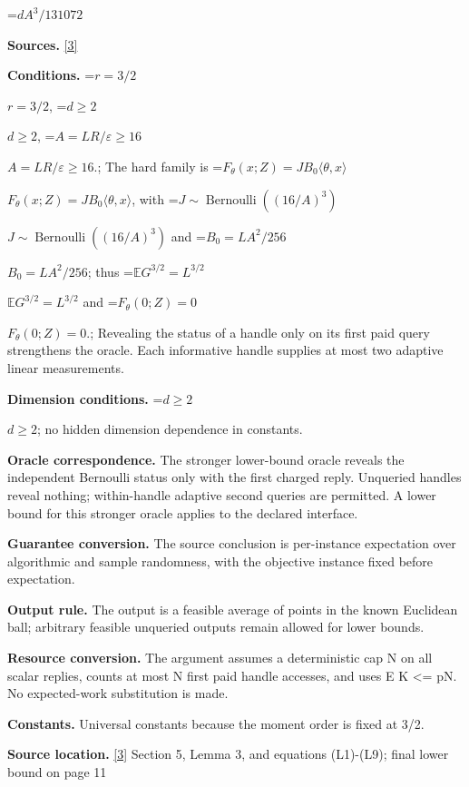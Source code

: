 \documentclass[10pt,a4paper]{article}
\newcommand{\AtlasMath}[1]{\par\begingroup\centering\setbox0=\hbox{$\displaystyle #1$}\ifdim\wd0>1.4\linewidth\typeout{ATLAS WIDE FORMULA: \the\wd0}\fi\ifdim\wd0>\linewidth\resizebox{\linewidth}{!}{\box0}\else\box0\fi\par\endgroup}
\newcommand{\AtlasInlineMath}[1]{\begingroup\setbox0=\hbox{$#1$}\ifdim\wd0>.4\linewidth\endgroup\AtlasMath{#1}\else\endgroup$#1$\fi}
\begin{document}
\AtlasMath{dA^3/131072}


\textbf{Sources.} \href{https://github.com/WU-Wendao/Colombo/blob/main/colombo_sensorium/Complexity_altas/data/sources/colombo/COLOMBO_KIMI_003/kimi_003.pdf}{[3]}



\textbf{Conditions.} \AtlasInlineMath{r=3/2}, \AtlasInlineMath{d\ge2}, \AtlasInlineMath{A=LR/\varepsilon\ge16}.; The hard family is \AtlasInlineMath{F_\theta(x;Z)=JB_0\langle\theta,x\rangle}, with \AtlasInlineMath{J\sim\operatorname{Bernoulli}((16/A)^3)} and \AtlasInlineMath{B_0=LA^2/256}; thus \AtlasInlineMath{\mathbb EG^{3/2}=L^{3/2}} and \AtlasInlineMath{F_\theta(0;Z)=0}.; Revealing the status of a handle only on its first paid query strengthens the oracle. Each informative handle supplies at most two adaptive linear measurements.



\textbf{Dimension conditions.} \AtlasInlineMath{d\ge2}; no hidden dimension dependence in constants.



\textbf{Oracle correspondence.} The stronger lower-bound oracle reveals the independent Bernoulli status only with the first charged reply. Unqueried handles reveal nothing; within-handle adaptive second queries are permitted. A lower bound for this stronger oracle applies to the declared interface.



\textbf{Guarantee conversion.} The source conclusion is per-instance expectation over algorithmic and sample randomness, with the objective instance fixed before expectation.



\textbf{Output rule.} The output is a feasible average of points in the known Euclidean ball; arbitrary feasible unqueried outputs remain allowed for lower bounds.



\textbf{Resource conversion.} The argument assumes a deterministic cap N on all scalar replies, counts at most N first paid handle accesses, and uses E K <= pN. No expected-work substitution is made.



\textbf{Constants.} Universal constants because the moment order is fixed at 3/2.



\textbf{Source location.} \href{https://github.com/WU-Wendao/Colombo/blob/main/colombo_sensorium/Complexity_altas/data/sources/colombo/COLOMBO_KIMI_003/kimi_003.pdf}{[3]} Section 5, Lemma 3, and equations (L1)-(L9); final lower bound on page 11
\end{document}
